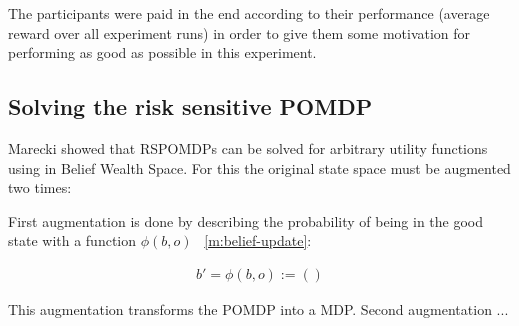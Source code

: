 The participants were paid in the end according to their performance (average reward over all experiment runs) in order to give them some motivation for performing as good as possible in this experiment.

\subsection{Solving the risk sensitive POMDP}

\normalsize
Marecki \cite{marecki} showed that RSPOMDPs can be solved for arbitrary utility functions using  in Belief Wealth Space.
For this the original state space must be augmented two times:

\begin{figure}[H]
\begin {center}
\end{center}
\end{figure}

First augmentation is done by describing the probability of being in the good state with a function $\phi(b,o)$ ~\autoref{m:belief-update}:

\begin{align}
    b' = \phi(b,o) := ()
\end{align}

This augmentation transforms the POMDP into a MDP.
Second augmentation ...